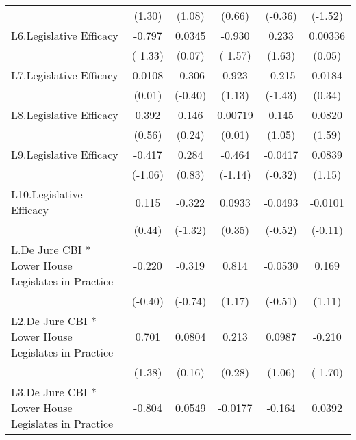 {\begin{longtable}{l*{5}{c}}
                &   (1.30)         &   (1.08)         &   (0.66)         &  (-0.36)         &  (-1.52)         \\
[1em]
L6.Legislative Efficacy&   -0.797         &   0.0345         &   -0.930         &    0.233         &  0.00336         \\
                &  (-1.33)         &   (0.07)         &  (-1.57)         &   (1.63)         &   (0.05)         \\
[1em]
L7.Legislative Efficacy&   0.0108         &   -0.306         &    0.923         &   -0.215         &   0.0184         \\
                &   (0.01)         &  (-0.40)         &   (1.13)         &  (-1.43)         &   (0.34)         \\
[1em]
L8.Legislative Efficacy&    0.392         &    0.146         &  0.00719         &    0.145         &   0.0820         \\
                &   (0.56)         &   (0.24)         &   (0.01)         &   (1.05)         &   (1.59)         \\
[1em]
L9.Legislative Efficacy&   -0.417         &    0.284         &   -0.464         &  -0.0417         &   0.0839         \\
                &  (-1.06)         &   (0.83)         &  (-1.14)         &  (-0.32)         &   (1.15)         \\
[1em]
L10.Legislative Efficacy&    0.115         &   -0.322         &   0.0933         &  -0.0493         &  -0.0101         \\
                &   (0.44)         &  (-1.32)         &   (0.35)         &  (-0.52)         &  (-0.11)         \\
[1em]
L.De Jure CBI * Lower House Legislates in Practice&   -0.220         &   -0.319         &    0.814         &  -0.0530         &    0.169         \\
                &  (-0.40)         &  (-0.74)         &   (1.17)         &  (-0.51)         &   (1.11)         \\
[1em]
L2.De Jure CBI * Lower House Legislates in Practice&    0.701         &   0.0804         &    0.213         &   0.0987         &   -0.210         \\
                &   (1.38)         &   (0.16)         &   (0.28)         &   (1.06)         &  (-1.70)         \\
[1em]
L3.De Jure CBI * Lower House Legislates in Practice&   -0.804         &   0.0549         &  -0.0177         &   -0.164         &   0.0392         \\

\end{longtable}}
